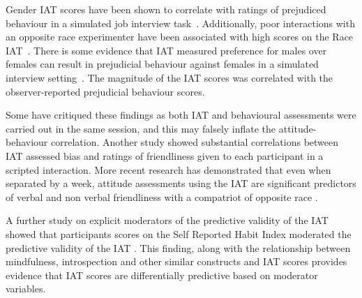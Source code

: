 

Gender IAT scores have been shown to correlate with ratings of prejudiced behaviour in a simulated job interview task~\cite{Rudman1999a}. Additionally, poor interactions with an opposite race experimenter have been associated with high scores on the Race IAT~\cite{McConnell2001}. 
There is some evidence that IAT measured preference for males over females  can result in prejudicial behaviour against females in a simulated interview setting~\cite{Greenwald2000,Heider2007}. The magnitude of the IAT scores was correlated with the observer-reported prejudicial behaviour scores. 

Some have critiqued these findings as both IAT and behavioural assessments were carried out in the same session, and this may falsely inflate the attitude-behaviour correlation. Another study \cite{McConnell2001} showed substantial correlations between IAT assessed bias and ratings of friendliness given to each participant in a scripted interaction. More recent research has demonstrated that even when separated by a week, attitude assessments using the IAT are significant predictors of verbal and non verbal friendliness with a compatriot of opposite race \cite{Heider2007}. 



A further study on explicit moderators of the predictive validity of the IAT showed that participants scores on the Self Reported Habit Index moderated the predictive validity of the IAT \cite{Conner2007}. This finding, along with the relationship between mindfulness, introspection and other similar constructs and IAT scores provides evidence that IAT scores are differentially predictive based on moderator variables. 



